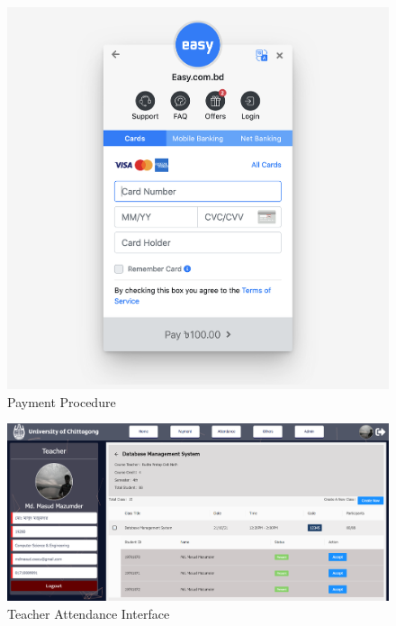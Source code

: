 \begin{figure}[H]
	\includegraphics[width=1\textwidth]{images/sslcommerz-card-entry}
	\caption{Payment Procedure}
\end{figure}
\begin{figure}[H]
	\includegraphics[width=1\textwidth]{images/teacher_att}
	\caption{Teacher Attendance Interface}
\end{figure}

